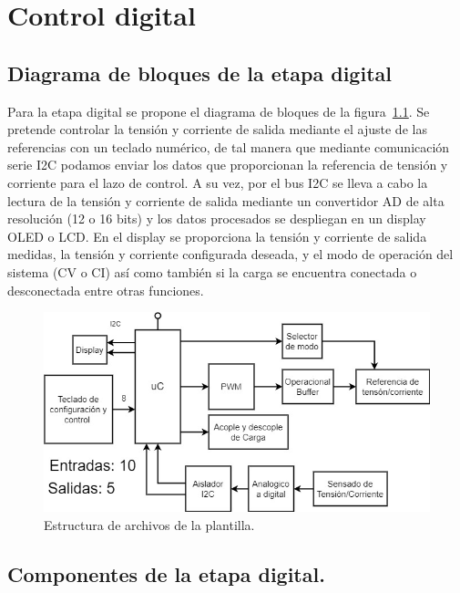 \chapter{Control digital}

\label{C:Digitalización y control}

\section{Diagrama de bloques de la etapa digital}
Para la etapa digital se propone el diagrama de bloques de la figura~\ref{F:diagrama_digital}. Se pretende controlar la tensión y corriente de salida mediante el ajuste de las referencias con un teclado numérico, de tal manera que mediante comunicación serie I2C podamos enviar los datos que proporcionan la referencia de tensión y corriente para el lazo de control. A su vez, por el bus I2C se lleva a cabo la lectura de la tensión y corriente de salida mediante un convertidor AD de alta resolución (12 o 16 bits) y los datos procesados se despliegan en un display OLED o LCD. En el display se proporciona la tensión y corriente de salida medidas, la tensión y corriente configurada deseada, y el modo de operación del sistema (CV o CI) así como también si la carga se encuentra conectada o desconectada entre otras funciones. 

\begin{figure}
    \centering
    \includegraphics[scale=0.5]{./imagenes/diagrama_digital.jpg}
    \caption{Estructura de archivos de la plantilla.}
    \label{F:diagrama_digital}
\end{figure}

\section{Componentes de la etapa digital.}

